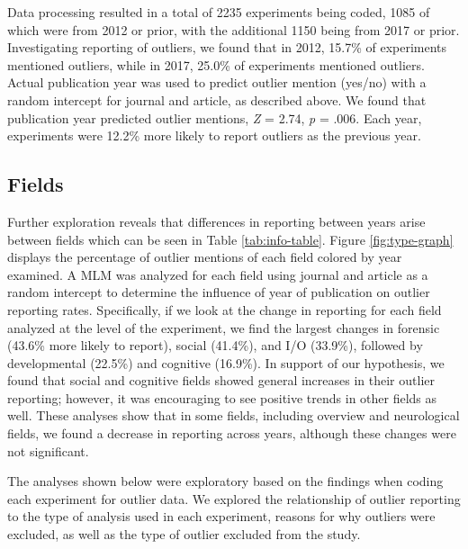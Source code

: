 \documentclass[english,,man]{apa6}
\begin{document}
Data processing resulted in a total of 2235 experiments being coded, 1085 of which were from 2012 or prior, with the additional 1150 being from 2017 or prior. Investigating reporting of outliers, we found that in 2012, 15.7\% of experiments mentioned outliers, while in 2017, 25.0\% of experiments mentioned outliers. Actual publication year was used to predict outlier mention (yes/no) with a random intercept for journal and article, as described above. We found that publication year predicted outlier mentions, \emph{Z} = 2.74, \emph{p} = .006. Each year, experiments were 12.2\% more likely to report outliers as the previous year.

\hypertarget{fields-1}{%
\subsection{Fields}\label{fields-1}}

Further exploration reveals that differences in reporting between years arise between fields which can be seen in Table \ref{tab:info-table}. Figure \ref{fig:type-graph} displays the percentage of outlier mentions of each field colored by year examined. A MLM was analyzed for each field using journal and article as a random intercept to determine the influence of year of publication on outlier reporting rates. Specifically, if we look at the change in reporting for each field analyzed at the level of the experiment, we find the largest changes in forensic (43.6\% more likely to report), social (41.4\%), and I/O (33.9\%), followed by developmental (22.5\%) and cognitive (16.9\%). In support of our hypothesis, we found that social and cognitive fields showed general increases in their outlier reporting; however, it was encouraging to see positive trends in other fields as well. These analyses show that in some fields, including overview and neurological fields, we found a decrease in reporting across years, although these changes were not significant.

The analyses shown below were exploratory based on the findings when coding each experiment for outlier data. We explored the relationship of outlier reporting to the type of analysis used in each experiment, reasons for why outliers were excluded, as well as the type of outlier excluded from the study.
\end{document}
